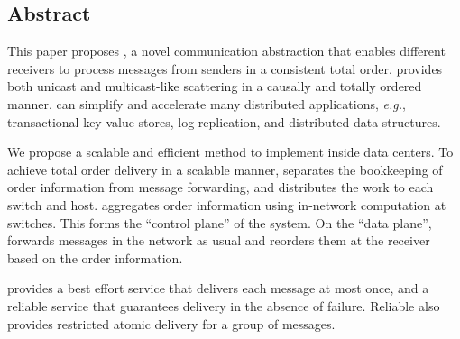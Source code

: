 \subsection*{Abstract}




This paper proposes \sys{}, a novel communication abstraction that enables different receivers to process messages from senders in a consistent total order.
\sys{} provides both unicast and multicast-like scattering in a causally and totally ordered manner.
\sys{} can simplify and accelerate many distributed applications, \emph{e.g.}, transactional key-value stores, log replication, and distributed data structures.

We propose a scalable and efficient method to implement \sys{} inside data centers. To achieve total order delivery in a scalable manner, \sys separates the bookkeeping of order information from message forwarding, and distributes the work to each switch and host. \sys aggregates order information using in-network computation at switches. This forms the ``control plane'' of the system. On the ``data plane'', \sys forwards messages in the network as usual and reorders them at the receiver based on the order information.

\sys{} provides a best effort service that delivers each message at most once, and a reliable service that guarantees delivery in the absence of failure. Reliable \sys{} also provides restricted atomic delivery for a group of messages. %

